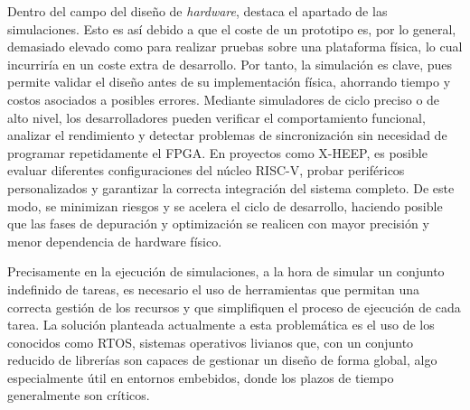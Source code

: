 Dentro del campo del diseño de \textit{hardware}, destaca el apartado de las simulaciones. Esto es así debido a que el coste de un prototipo es, por lo general, demasiado elevado como para realizar pruebas sobre una plataforma física, lo cual incurriría en un coste extra de desarrollo. Por tanto, la simulación es clave, pues permite validar el diseño antes de su implementación física, ahorrando tiempo y costos asociados a posibles errores. Mediante simuladores de ciclo preciso o de alto nivel, los desarrolladores pueden verificar el comportamiento funcional, analizar el rendimiento y detectar problemas de sincronización sin necesidad de programar repetidamente el FPGA. En proyectos como X-HEEP, es posible evaluar diferentes configuraciones del núcleo RISC-V, probar periféricos personalizados y garantizar la correcta integración del sistema completo. De este modo, se minimizan riesgos y se acelera el ciclo de desarrollo, haciendo posible que las fases de depuración y optimización se realicen con mayor precisión y menor dependencia de hardware físico. 

Precisamente en la ejecución de simulaciones, a la hora de simular un conjunto indefinido de tareas, es necesario el uso de herramientas que permitan una correcta gestión de los recursos y que simplifiquen el proceso de ejecución de cada tarea. La solución planteada actualmente a esta problemática es el uso de los conocidos como RTOS, sistemas operativos livianos que, con un conjunto reducido de librerías son capaces de gestionar un diseño de forma global, algo especialmente útil en entornos embebidos, donde los plazos de tiempo generalmente son críticos.


